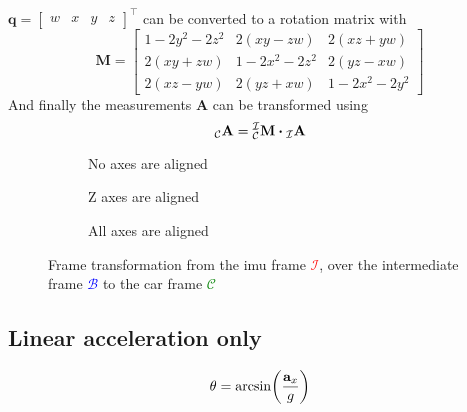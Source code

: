 $\mathbf{q} = \left[\begin{array}{llll} w & x & y & z \end{array}\right]^{\top}$
can be converted to a rotation matrix with
\begin{equation}
    \mathbf{M} =
    \left[
        \begin{array}{ccc}
            1-2 y^{2}-2 z^{2} & 2(x y-z w) & 2(x z+y w) \\
            2(x y+z w) & 1-2 x^{2}-2 z^{2} & 2(y z-x w) \\
            2(x z-y w) & 2(y z+x w) & 1-2 x^{2}-2 y^{2}
        \end{array}
        \right]
    \end{equation}
And finally the measurements $\mathbf{A}$ can be transformed using
\begin{equation}
    \vincs{A}{c} = \mtf{i}{c} \vdot \vincs{A}{i}
\end{equation}
\begin{figure}[htb]
    \centering
    \begin{subfigure}[b]{0.3\textwidth}
        \centering
        
        \caption{No axes are aligned}
        \label{fig:tikz_frame_transformation_init}
    \end{subfigure}
    \hfill
    \begin{subfigure}[b]{0.3\textwidth}
        \centering
        
        \caption{Z axes are aligned}
        \label{fig:tikz_frame_transformation_intermediate}
    \end{subfigure}
    \hfill
    \begin{subfigure}[b]{0.3\textwidth}
        \centering
        
        \caption{All axes are aligned}
        \label{fig:tikz_frame_transformation_final}
    \end{subfigure}
    \caption{Frame transformation from the \gls{imu} frame \textcolor{red}{$\mathcal{I}$}, over the intermediate frame \textcolor{blue}{$\mathcal{B}$} to the car frame \textcolor{green}{$\mathcal{C}$}}
    \label{fig:tikz_frame_transformation}
\end{figure}

\subsection{Linear acceleration only}
\begin{equation}
    \theta = \arcsin(\frac{\vb{a}_x}{g})
\end{equation}

